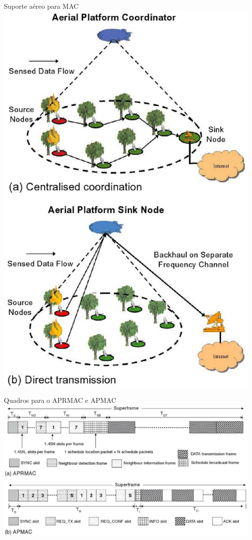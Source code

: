 \documentclass{beamer}
\begin{document}
\begin{frame}{Suporte aéreo para MAC \cite{20100312645920} \hyperlink{aerial_back}{}}
\hypertarget{aerial}{}
\includegraphics[scale=0.2]{imagens/aerial}
\end{frame}

\begin{frame}{Quadros para o APRMAC e APMAC \cite{20100312645920} \hyperlink{quadro_aerial_back}{}}
\hypertarget{quadro_aerial}{}
\includegraphics[scale=0.3]{imagens/quadro_aerial}
\end{frame}
\end{document}
